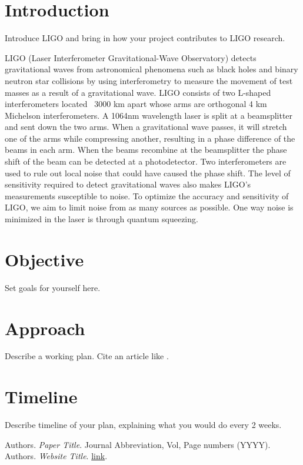 \documentclass[colorlinks=true,pdfstartview=FitV,linkcolor=blue,
citecolor=red,urlcolor=magenta]{ligodoc}
\title{}
\author{}
\begin{document}
\tableofcontents

\newpage
\section{Introduction}
Introduce LIGO and bring in how your project contributes to LIGO research.

LIGO (Laser Interferometer Gravitational-Wave Observatory) detects gravitational waves from astronomical phenomena such as black holes and binary neutron star collisions by using interferometry to measure the movement of test masses as a result of a gravitational wave. LIGO consists of two L-shaped interferometers located ~3000 km apart whose arms are orthogonal 4 km Michelson interferometers. A 1064nm wavelength laser is split at a beamsplitter and sent down the two arms. When a gravitational wave passes, it will stretch one of the arms while compressing another, resulting in a phase difference of the beams in each arm. When the beams recombine at the beamsplitter the phase shift of the beam can be detected at a photodetector. Two interferometers are used to rule out local noise that could have caused the phase shift. The level of sensitivity required to detect gravitational waves also makes LIGO's measurements susceptible to noise. To optimize the accuracy and sensitivity of LIGO, we aim to limit noise from as many sources as possible. One way noise is minimized in the laser is through quantum squeezing. 
\section{Objective}
Set goals for yourself here.

\section{Approach}
Describe a working plan. Cite an article like \cite{PDH}.

\section{Timeline}
Describe timeline of your plan, explaining what you would do every 2 weeks.

\begin{thebibliography}{9}
 Authors. \emph{Paper Title}. Journal Abbreviation, Vol, Page numbers (YYYY).
 Authors. \emph{Website Title}. \url{link}.

\end{thebibliography}
\end{document}
